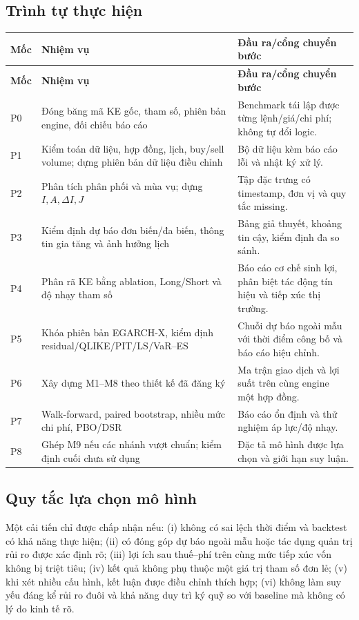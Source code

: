 \documentclass[12pt,a4paper,oneside]{article}
\begin{document}
\subsection{Trình tự thực hiện}
\begin{longtable}{p{1.35cm}p{6.0cm}p{6.6cm}}
\toprule
\textbf{Mốc} & \textbf{Nhiệm vụ} & \textbf{Đầu ra/cổng chuyển bước}\\\midrule\endfirsthead
\toprule\textbf{Mốc}&\textbf{Nhiệm vụ}&\textbf{Đầu ra/cổng chuyển bước}\\\midrule\endhead
P0& Đóng băng mã KE gốc, tham số, phiên bản engine, đối chiếu báo cáo & Benchmark tái lập được từng lệnh/giá/chi phí; không tự đổi logic.\\
P1& Kiểm toán dữ liệu, hợp đồng, lịch, buy/sell volume; dựng phiên bản dữ liệu điều chỉnh & Bộ dữ liệu kèm báo cáo lỗi và nhật ký xử lý.\\
P2& Phân tích phân phối và mùa vụ; dựng $I,A,\Delta I,J$ & Tập đặc trưng có timestamp, đơn vị và quy tắc missing.\\
P3& Kiểm định dự báo đơn biến/đa biến, thông tin gia tăng và ảnh hưởng lịch & Bảng giả thuyết, khoảng tin cậy, kiểm định đa so sánh.\\
P4& Phân rã KE bằng ablation, Long/Short và độ nhạy tham số & Báo cáo cơ chế sinh lợi, phân biệt tác động tín hiệu và tiếp xúc thị trường.\\
P5& Khóa phiên bản EGARCH-X, kiểm định residual/QLIKE/PIT/LS/VaR--ES & Chuỗi dự báo ngoài mẫu với thời điểm công bố và báo cáo hiệu chỉnh.\\
P6& Xây dựng M1--M8 theo thiết kế đã đăng ký & Ma trận giao dịch và lợi suất trên cùng engine một hợp đồng.\\
P7& Walk-forward, paired bootstrap, nhiều mức chi phí, PBO/DSR & Báo cáo ổn định và thử nghiệm áp lực/độ nhạy.\\
P8& Ghép M9 nếu các nhánh vượt chuẩn; kiểm định cuối chưa sử dụng & Đặc tả mô hình được lựa chọn và giới hạn suy luận.\\
\bottomrule
\end{longtable}

\subsection{Quy tắc lựa chọn mô hình}
Một cải tiến chỉ được chấp nhận nếu: (i) không có sai lệch thời điểm và backtest có khả năng thực hiện; (ii) có đóng góp dự báo ngoài mẫu hoặc tác dụng quản trị rủi ro được xác định rõ; (iii) lợi ích sau thuế--phí trên cùng mức tiếp xúc vốn không bị triệt tiêu; (iv) kết quả không phụ thuộc một giá trị tham số đơn lẻ; (v) khi xét nhiều cấu hình, kết luận được điều chỉnh thích hợp; (vi) không làm suy yếu đáng kể rủi ro đuôi và khả năng duy trì ký quỹ so với baseline mà không có lý do kinh tế rõ.
\end{document}
